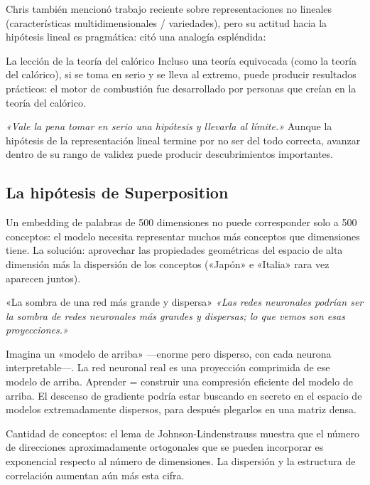 \documentclass[a4paper]{article}
\begin{document}
Chris también mencionó trabajo reciente sobre representaciones no lineales (características multidimensionales / variedades), pero su actitud hacia la hipótesis lineal es pragmática: citó una analogía espléndida:

\begin{knowledgebox}{La lección de la teoría del calórico}
Incluso una teoría equivocada (como la teoría del calórico), si se toma en serio y se lleva al extremo, puede producir resultados prácticos: el motor de combustión fue desarrollado por personas que creían en la teoría del calórico.

\textit{«Vale la pena tomar en serio una hipótesis y llevarla al límite.»} Aunque la hipótesis de la representación lineal termine por no ser del todo correcta, avanzar dentro de su rango de validez puede producir descubrimientos importantes.
\end{knowledgebox}

\subsection{La hipótesis de Superposition}

Un embedding de palabras de 500 dimensiones no puede corresponder solo a 500 conceptos: el modelo necesita representar muchos más conceptos que dimensiones tiene. La solución: aprovechar las propiedades geométricas del espacio de alta dimensión más la dispersión de los conceptos («Japón» e «Italia» rara vez aparecen juntos).

\begin{importantbox}{«La sombra de una red más grande y dispersa»}
\textit{«Las redes neuronales podrían ser la sombra de redes neuronales más grandes y dispersas; lo que vemos son esas proyecciones.»}

Imagina un «modelo de arriba» —enorme pero disperso, con cada neurona interpretable—. La red neuronal real es una proyección comprimida de ese modelo de arriba. Aprender = construir una compresión eficiente del modelo de arriba. El descenso de gradiente podría estar buscando en secreto en el espacio de modelos extremadamente dispersos, para después plegarlos en una matriz densa.

Cantidad de conceptos: el lema de Johnson-Lindenstrauss muestra que el número de direcciones aproximadamente ortogonales que se pueden incorporar es exponencial respecto al número de dimensiones. La dispersión y la estructura de correlación aumentan aún más esta cifra.
\end{importantbox}
\end{document}
